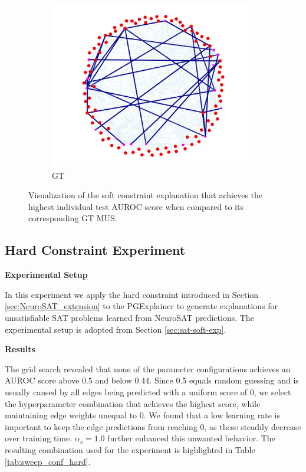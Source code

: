 \begin{figure}[h]
\begin{subfigure}[b]{0.3\textwidth}
        \label{fig:soft_shared}
    \end{subfigure}
    \begin{subfigure}[b]{0.3\textwidth}
        \includegraphics[width=\linewidth]{img/SAT-soft/2025-05-14 20_52_03-seed4_highestAUC_gt_TEST.html.png}
        \caption{\ac{GT}}
        \label{fig:soft_gt}
    \end{subfigure}
    \caption[Visualization of the best soft constraint explanation]{Visualization of the soft constraint explanation that achieves the highest individual test AUROC score when compared to its corresponding \ac{GT} MUS.}
    \label{fig:soft_quant}
\end{figure}

\subsection{Hard Constraint Experiment}
\label{sec:sat-hard-exp}
\textbf{Experimental Setup}\par
In this experiment we apply the hard constraint introduced in Section \ref{sec:NeuroSAT_extension} to the PGExplainer to generate explanations for unsatisfiable SAT problems learned from NeuroSAT predictions. The experimental setup is adopted from Section \ref{sec:sat-soft-exp}. \bigskip

\textbf{Results}\par
The grid search revealed that none of the parameter configurations achieves an AUROC score above $0.5$ and below $0.44$. Since $0.5$ equals random guessing and is usually caused by all edges being predicted with a uniform score of 0, we select the hyperparameter combination that achieves the highest score, while maintaining edge weights unequal to 0. We found that a low learning rate is important to keep the edge predictions from reaching 0, as these steadily decrease over training time. $\alpha_s=1.0$ further enhanced this unwanted behavior. The resulting combination used for the experiment is highlighted in Table \ref{tab:sweep_conf_hard}. \bigskip


